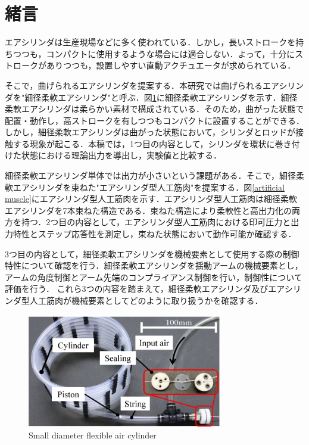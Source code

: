 \section{緒言}%
エアシリンダは生産現場などに多く使われている．しかし，長いストロークを持ちつつも，コンパクトに使用するような場合には適合しない．よって，十分にストロークがありつつも，設置しやすい直動アクチュエータが求められている．
\par
そこで，曲げられるエアシリンダを提案する．本研究では曲げられるエアシリンダを"細径柔軟エアシリンダ"と呼ぶ．図\ref{Small diameter flexible air cylinder}に細径柔軟エアシリンダを示す．細径柔軟エアシリンダは柔らかい素材で構成されている．そのため，曲がった状態で配置・動作し，高ストロークを有しつつもコンパクトに設置することができる．しかし，細径柔軟エアシリンダは曲がった状態において，シリンダとロッドが接触する現象が起こる．本稿では，1つ目の内容として，シリンダを環状に巻き付けた状態における理論出力を導出し，実験値と比較する．
\par
細径柔軟エアシリンダ単体では出力が小さいという課題がある．そこで，細径柔軟エアシリンダを束ねた"エアシリンダ型人工筋肉"を提案する．図\ref{artificial muscle}にエアシリンダ型人工筋肉を示す．エアシリンダ型人工筋肉は細径柔軟エアシリンダを7本束ねた構造である．束ねた構造により柔軟性と高出力化の両方を持つ．2つ目の内容として，エアシリンダ型人工筋肉における印可圧力と出力特性とステップ応答性を測定し，束ねた状態において動作可能か確認する．
\par
3つ目の内容として，細径柔軟エアシリンダを機械要素として使用する際の制御特性について確認を行う．細径柔軟エアシリンダを揺動アームの機械要素とし，アームの角度制御とアーム先端のコンプライアンス制御を行い，制御性について評価を行う．
これら3つの内容を踏まえて，細径柔軟エアシリンダ及びエアシリンダ型人工筋肉が機械要素としてどのように取り扱うかを確認する．

\begin{figure}[t]
  \centering
  \includegraphics[width=85mm]{_pdf/細径柔軟エアシリンダ-１本.pdf}
  \caption{Small diameter flexible air cylinder}
  \label{Small diameter flexible air cylinder}
\end{figure}

